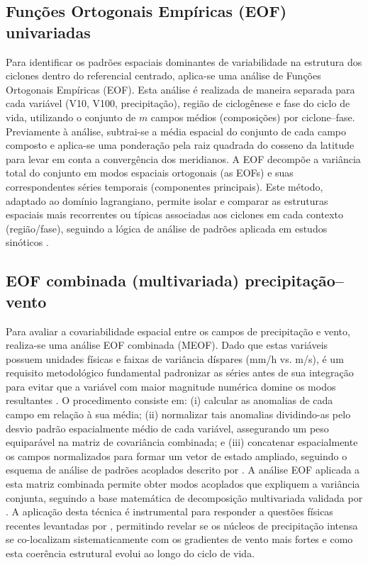 \subsection{Funções Ortogonais Empíricas (EOF) univariadas}\label{subsec:eof_univariado}
Para identificar os padrões espaciais dominantes de variabilidade na estrutura dos ciclones dentro do referencial centrado, aplica-se uma análise de Funções Ortogonais Empíricas (EOF). Esta análise é realizada de maneira separada para cada variável (V10, V100, precipitação), região de ciclogênese e fase do ciclo de vida, utilizando o conjunto de $m$ campos médios (composições) por ciclone--fase. Previamente à análise, subtrai-se a média espacial do conjunto de cada campo composto e aplica-se uma ponderação pela raiz quadrada do cosseno da latitude para levar em conta a convergência dos meridianos. A EOF decompõe a variância total do conjunto em modos espaciais ortogonais (as EOFs) e suas correspondentes séries temporais (componentes principais). Este método, adaptado ao domínio lagrangiano, permite isolar e comparar as estruturas espaciais mais recorrentes ou típicas associadas aos ciclones em cada contexto (região/fase), seguindo a lógica de análise de padrões aplicada em estudos sinóticos \citep{vera2002cold}.


\subsection{EOF combinada (multivariada) precipitação--vento}\label{subsec:eof_multivariado}
Para avaliar a covariabilidade espacial entre os campos de precipitação e vento, realiza-se uma análise EOF combinada (MEOF). Dado que estas variáveis possuem unidades físicas e faixas de variância díspares (mm/h vs. m/s), é um requisito metodológico fundamental padronizar as séries antes de sua integração para evitar que a variável com maior magnitude numérica domine os modos resultantes \citep{wilks2019statistical}. O procedimento consiste em: (i) calcular as anomalias de cada campo em relação à sua média; (ii) normalizar tais anomalias dividindo-as pelo desvio padrão espacialmente médio de cada variável, assegurando um peso equiparável na matriz de covariância combinada; e (iii) concatenar espacialmente os campos normalizados para formar um vetor de estado ampliado, seguindo o esquema de análise de padrões acoplados descrito por \citet{bretherton1992intercomparison}. A análise EOF aplicada a esta matriz combinada permite obter modos acoplados que expliquem a variância conjunta, seguindo a base matemática de decomposição multivariada validada por \citet{liang2018multivariate}. A aplicação desta técnica é instrumental para responder a questões físicas recentes levantadas por \citet{sinclair2023relationship}, permitindo revelar se os núcleos de precipitação intensa se co-localizam sistematicamente com os gradientes de vento mais fortes e como esta coerência estrutural evolui ao longo do ciclo de vida.
